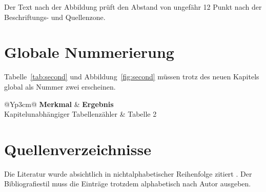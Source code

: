 \documentclass[
  12pt,
  a4paper,
  oneside,
  headings=normal,
  numbers=noendperiod,
  bibliography=totoc
]{scrreprt}
\begin{document}
\begin{hfhfigure}
  \caption{Einzeilig gesetzter Prozess innerhalb einer Abbildung}
  \label{fig:process}
\end{hfhfigure}

Der Text nach der Abbildung prüft den Abstand von ungefähr 12 Punkt nach der
Beschriftungs- und Quellenzone.

\chapter{Globale Nummerierung}

Tabelle~\ref{tab:second} und Abbildung~\ref{fig:second} müssen trotz des neuen
Kapitels global als Nummer zwei erscheinen.

\begin{hfhtable}
  \caption{Zweite Tabelle in einem neuen Kapitel}
  \label{tab:second}
  \begin{tabularx}{\textwidth}{@{}Yp{3cm}@{}}
    \toprule
    \textbf{Merkmal} & \textbf{Ergebnis} \\
    \midrule
    Kapitelunabhängiger Tabellenzähler & Tabelle 2 \\
    \bottomrule
  \end{tabularx}
\end{hfhtable}

\begin{hfhfigure}
  \fbox{\rule{0pt}{2.2cm}\rule{0.58\textwidth}{0pt}}
  \caption{Zweite Abbildung in einem neuen Kapitel}
  \label{fig:second}
\end{hfhfigure}

\chapter{Quellenverzeichnisse}

Die Literatur wurde absichtlich in nichtalphabetischer Reihenfolge zitiert
\parencite{zimmer2022,adler2020,becker2021}. Der Bibliografiestil muss die
Einträge
trotzdem alphabetisch nach Autor ausgeben.

\printbibliography[heading=bibintoc,title={Quellenverzeichnis}]


\begin{hfhsourceentries}
\end{hfhsourceentries}

\label{LastNumberedPage}
\end{document}
